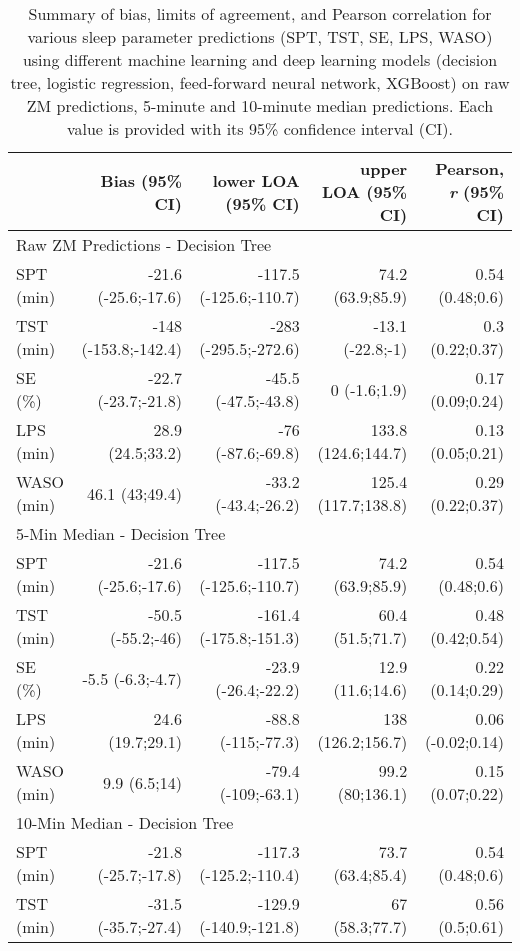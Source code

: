 \documentclass[
  9pt,
]{scrbook}
\begin{document}
\hypertarget{tbl-13}{}
\begin{longtable}{lrrrr}
\caption{\label{tbl-13}Summary of bias, limits of agreement, and Pearson correlation for
various sleep parameter predictions (SPT, TST, SE, LPS, WASO) using
different machine learning and deep learning models (decision tree,
logistic regression, feed-forward neural network, XGBoost) on raw ZM
predictions, 5-minute and 10-minute median predictions. Each value is
provided with its 95\% confidence interval (CI). }\tabularnewline

\toprule
 & Bias (95\% CI) & lower LOA (95\% CI) & upper LOA (95\% CI) & Pearson, \emph{r} (95\% CI) \\ 
\midrule
\multicolumn{5}{l}{Raw ZM Predictions - Decision Tree} \\ 
\midrule
SPT (min) & -21.6 (-25.6;-17.6) & -117.5 (-125.6;-110.7) & 74.2 (63.9;85.9) & 0.54 (0.48;0.6) \\ 
TST (min) & -148 (-153.8;-142.4) & -283 (-295.5;-272.6) & -13.1 (-22.8;-1) & 0.3 (0.22;0.37) \\ 
SE (\%) & -22.7 (-23.7;-21.8) & -45.5 (-47.5;-43.8) & 0 (-1.6;1.9) & 0.17 (0.09;0.24) \\ 
LPS (min) & 28.9 (24.5;33.2) & -76 (-87.6;-69.8) & 133.8 (124.6;144.7) & 0.13 (0.05;0.21) \\ 
WASO (min) & 46.1 (43;49.4) & -33.2 (-43.4;-26.2) & 125.4 (117.7;138.8) & 0.29 (0.22;0.37) \\ 
\midrule
\multicolumn{5}{l}{5-Min Median - Decision Tree} \\ 
\midrule
SPT (min) & -21.6 (-25.6;-17.6) & -117.5 (-125.6;-110.7) & 74.2 (63.9;85.9) & 0.54 (0.48;0.6) \\ 
TST (min) & -50.5 (-55.2;-46) & -161.4 (-175.8;-151.3) & 60.4 (51.5;71.7) & 0.48 (0.42;0.54) \\ 
SE (\%) & -5.5 (-6.3;-4.7) & -23.9 (-26.4;-22.2) & 12.9 (11.6;14.6) & 0.22 (0.14;0.29) \\ 
LPS (min) & 24.6 (19.7;29.1) & -88.8 (-115;-77.3) & 138 (126.2;156.7) & 0.06 (-0.02;0.14) \\ 
WASO (min) & 9.9 (6.5;14) & -79.4 (-109;-63.1) & 99.2 (80;136.1) & 0.15 (0.07;0.22) \\ 
\midrule
\multicolumn{5}{l}{10-Min Median - Decision Tree} \\ 
\midrule
SPT (min) & -21.8 (-25.7;-17.8) & -117.3 (-125.2;-110.4) & 73.7 (63.4;85.4) & 0.54 (0.48;0.6) \\ 
TST (min) & -31.5 (-35.7;-27.4) & -129.9 (-140.9;-121.8) & 67 (58.3;77.7) & 0.56 (0.5;0.61) \\ 

\end{longtable}
\end{document}
